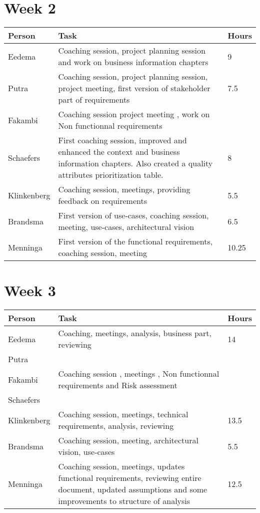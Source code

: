 \section{Week 2}
\begin{tabular}{L{0.2\textwidth} L{0.7\textwidth} L{0.1\textwidth}}
    \textbf{Person} & \textbf{Task} & \textbf{Hours} \\ \toprule
	Eedema & Coaching session, project planning session and work on business information chapters & 9  \\ \midrule
	Putra & Coaching session, project planning session, project meeting, first version of stakeholder part of requirements & 7.5 \\ \midrule
	Fakambi & Coaching session  project meeting , work on Non functionnal requirements & \\ \midrule
	Schaefers & First coaching session, improved and enhanced the context and business information chapters. Also created a quality attributes prioritization table.& 8 \\ \midrule
	Klinkenberg & Coaching session, meetings, providing feedback on requirements & 5.5\\ \midrule
	Brandsma & First version of use-cases, coaching session, meeting, use-cases, architectural vision & 6.5 \\ \midrule
	Menninga & First version of the functional requirements, coaching session, meeting & 10.25 \\ \bottomrule
\end{tabular}

\section{Week 3}
\begin{tabular}{p{} p{} p{}}
   \textbf{Person} & \textbf{Task} & \textbf{Hours} \\ \midrule
	Eedema &  Coaching, meetings, analysis, business part, reviewing & 14  \\ \midrule
	Putra &  &  \\ \midrule
	Fakambi & Coaching session , meetings , Non functionnal requirements and Risk assessment & \\ \midrule
	Schaefers &  & \\ \midrule
	Klinkenberg & Coaching session, meetings, technical requirements, analysis, reviewing & 13.5 \\ \midrule
	Brandsma & Coaching session, meeting, architectural vision, use-cases & 5.5 \\ \midrule
	Menninga & Coaching session, meetings, updates functional requirements, reviewing entire document, updated assumptions and some improvements to structure of analysis & 12.5 \\ \midrule
\end{tabular}